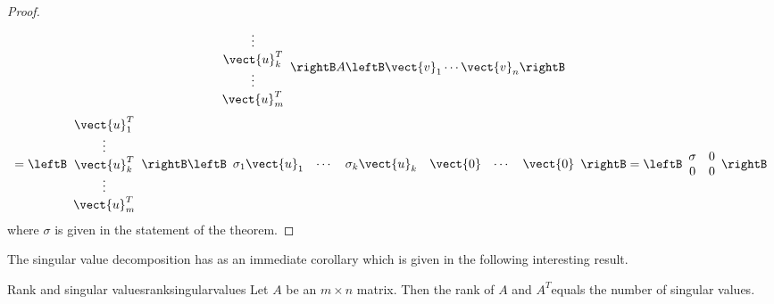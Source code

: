 \begin{proof}
\begin{equation*}
\begin{array}{c}
\vdots \\ 
\vect{u}_{k}^T \\ 
\vdots \\ 
\vect{u}_{m}^T
\end{array}
\rightB A\leftB \vect{v}_{1}\cdots \vect{v}_{n}\rightB
\end{equation*}
\begin{equation*}
=\leftB 
\begin{array}{c}
\vect{u}_{1}^T \\ 
\vdots \\ 
\vect{u}_{k}^T \\ 
\vdots \\ 
\vect{u}_{m}^T
\end{array}
\rightB \leftB 
\begin{array}{cccccc}
\sigma _{1}\vect{u}_{1} & \cdots & \sigma _{k}\vect{u}_{k} & \vect{0}
& \cdots & \vect{0}
\end{array}
\rightB =\leftB 
\begin{array}{cc}
\sigma & 0 \\ 
0 & 0
\end{array}
\rightB
\end{equation*}
where $\sigma $ is given in the statement of the theorem. 
\end{proof}

The singular value decomposition has as an immediate corollary which is given in the following interesting result. 

\begin{corollary}{Rank and singular values}{ranksingularvalues}
Let $A$ be an $m\times n$ matrix. Then the rank of $A$ and $A^T$equals
the number of singular values.
\end{corollary}


